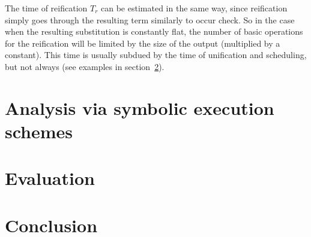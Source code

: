 \documentclass[acmsmall, anonymous, review]{acmart}
\newcommand{\sectionword}{section}
\begin{document}
The time of reification $T_r$ can be estimated in the same way, since reification simply goes through the resulting term similarly to occur check. So in the case when the resulting substitution is constantly flat, the number of basic operations for the reification will be limited by the size of the output (multiplied by a constant). This time is usually subdued by the time of unification and scheduling, but not always (see examples in \sectionword~\ref{sec:evaluation}).




\section{Analysis via symbolic execution schemes}

\section{Evaluation}
\label{sec:evaluation}


\section{Conclusion}


\begin{acks}

\end{acks}




\appendix
\end{document}
